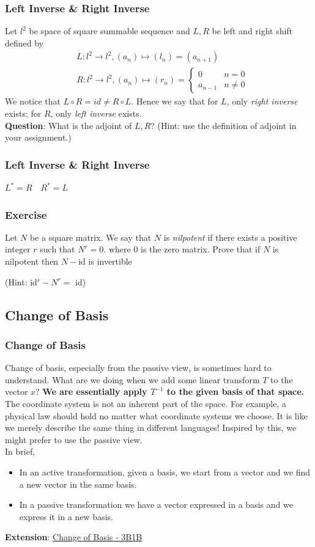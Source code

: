 \documentclass[12pt, t]{beamer}
\renewcommand{\emph}[1]{{\color{Turquoise3}\textsl{#1}}}
\newcommand{\nullspace}{~\\[15pt]}
\begin{document}
\begin{frame}
    \frametitle{Left Inverse \& Right Inverse}
    Let $l^2$ be space of square summable sequence and $L,R$ be left and right shift defined by
    $$
        \begin{aligned}
             & L:l^2\rightarrow l^2, (a_n)\mapsto(l_n)=(a_{n+1})                  \\
             & R:l^2\rightarrow l^2, (a_n)\mapsto(r_n)=\begin{cases}
                0       & n=0     \\
                a_{n-1} & n\neq 0
            \end{cases}
        \end{aligned}
    $$
    We notice that $L\circ R=id\neq R\circ L$. Hence we say that for $L$, only \textit{right inverse} exists; for $R$, only \textit{left inverse} exists.\nullspace
    \textbf{Question}: What is the adjoint of $L,R$? (Hint: use the definition of adjoint in your assignment.)
\end{frame}

\begin{frame}
    \frametitle{Left Inverse \& Right Inverse}
    \pause $L^*=R\quad R^*=L$
\end{frame}

\begin{frame}
    \frametitle{Exercise}
    Let $N$ be a square matrix. We say that $N$ is \emph{nilpotent} if there exists a positive integer $r$ such that $N^{r}=0 .$ where $0$ is the zero matrix. Prove that if $N$ is nilpotent then $N-$id is invertible

    (Hint: id$^r-N^r=$ id)

\end{frame}

\subsection{Change of Basis}
\begin{frame}
    \frametitle{Change of Basis}
    \small Change of basis, especially from the passive view, is sometimes hard to understand. What are we doing when we add some linear transform $T$ to the vector $x$? \textbf{We are essentially apply $T^{-1}$ to the given basis of that space.} The coordinate system is not an inherent part of the space. For example, a physical law should hold no matter what coordinate systems we choose. It is like we merely describe the same thing in different languages! Inspired by this, we might prefer to use the passive view.\\
    In brief,
    \begin{itemize}
        \item In an active transformation, given a basis, we start from a vector and we find a new vector in the same basis.
        \item In a passive transformation we have a vector expressed in a basis and we express it in a new basis.
    \end{itemize}
    \textbf{Extension}:
    \href{https://www.youtube.com/watch?v=P2LTAUO1TdA}{Change of Basis - 3B1B}
\end{frame}
\end{document}
